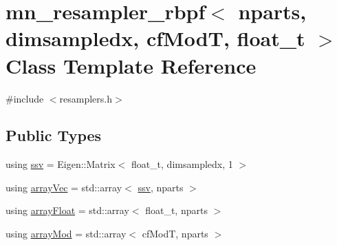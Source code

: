 \hypertarget{classmn__resampler__rbpf}{}\section{mn\+\_\+resampler\+\_\+rbpf$<$ nparts, dimsampledx, cf\+ModT, float\+\_\+t $>$ Class Template Reference}
\label{classmn__resampler__rbpf}


{\ttfamily \#include $<$resamplers.\+h$>$}

\subsection*{Public Types}
\begin{DoxyCompactItemize}
\item 
using \hyperlink{classmn__resampler__rbpf_aff8bcd12cfe60425c4406262a9640d68}{ssv} = Eigen\+::\+Matrix$<$ float\+\_\+t, dimsampledx, 1 $>$
\item 
using \hyperlink{classmn__resampler__rbpf_a9eddf10f48c19b555276bbd23826044b}{array\+Vec} = std\+::array$<$ \hyperlink{classmn__resampler__rbpf_aff8bcd12cfe60425c4406262a9640d68}{ssv}, nparts $>$
\item 
using \hyperlink{classmn__resampler__rbpf_a43fa641c6d15c8ee79da47d6af02ac16}{array\+Float} = std\+::array$<$ float\+\_\+t, nparts $>$
\item 
using \hyperlink{classmn__resampler__rbpf_a268fe176a23e146b8f0c1acbaf8625b3}{array\+Mod} = std\+::array$<$ cf\+ModT, nparts $>$
\end{DoxyCompactItemize}
